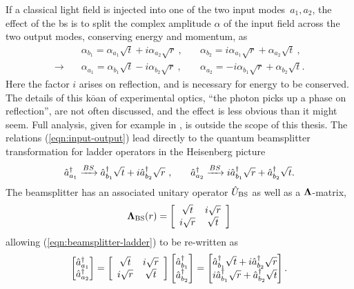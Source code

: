 If a classical light field is injected into one of the two input modes~$a_1, a_2$,  the effect of the \gls{bs} is to split the 
complex amplitude $\alpha$ of the input field across the two output modes, conserving energy and momentum, as
\begin{align}
    &\alpha_{b_1} = \alpha_{a_1} \sqrt{t} + i \alpha_{a_2} \sqrt{r}~,\quad
    &\alpha_{b_2} = i \alpha_{a_1} \sqrt{r} + \alpha_{a_2} \sqrt{t}~,\\
    \rightarrow \quad   &\alpha_{a_1} = \alpha_{b_1} \sqrt{t} - i \alpha_{b_2} \sqrt{r}~,\quad
    &\alpha_{a_2} = - i \alpha_{b_1} \sqrt{r} + \alpha_{b_2} \sqrt{t}.
    \label{eqn:input-output}
\end{align}
Here the factor $i$ arises on reflection, and is necessary for energy to be conserved. 
The details of this k$\mathrm{\bar{o}}$an of experimental optics, ``the photon picks up a phase on reflection'', are not often discussed, and the effect is less obvious than it might seem. Full analysis, given for example in \cite{Zetie2000}, is outside the scope of this thesis.
The relations (\ref{eqn:input-output}) lead directly to the quantum beamsplitter transformation for ladder operators in the Heisenberg picture
\begin{align}
    &\hat{a}^{\dagger}_{a_1}  \xrightarrow{BS} \hat{a}^{\dagger}_{b_1} \sqrt{t} + i \hat{a}^{\dagger}_{b_2} \sqrt{r} ~,\quad
    &\hat{a}^{\dagger}_{a_2}  \xrightarrow{BS} i \hat{a}^{\dagger}_{b_1} \sqrt{r} + \hat{a}^{\dagger}_{b_2} \sqrt{t}.
    \label{eqn:beamsplitter-ladder}
\end{align}
The beamsplitter has an associated unitary operator $\hat{U}_\mathrm{BS}$ as well as a $\mathbf{\Lambda}$-matrix, 
\begin{gather}
    \mathbf{\Lambda}_\mathrm{BS}(r)=
    \left[
    \begin{array}{cc}
        \sqrt{t} & i\sqrt{r} \\
        i\sqrt{r} & \sqrt{t} 
    \end{array}
\right]
\label{eqn:beamsplitter-unitary}
\end{gather}
allowing (\ref{eqn:beamsplitter-ladder}) to be re-written as 
\begin{gather}
\begin{bmatrix} \hat{a}^{\dagger}_{a_1}\\ \hat{a}^{\dagger}_{a_2} \end{bmatrix} 
=
\left[
\begin{array}{cc} \sqrt{t} & i\sqrt{r}\\ i\sqrt{r} & \sqrt{t} \end{array} 
\right]
\begin{bmatrix} \hat{a}^{\dagger}_{b_1}\\ \hat{a}^{\dagger}_{b_2} \end{bmatrix} 
=
\begin{bmatrix} 
    \hat{a}^{\dagger}_{b_1}\sqrt{t}  + i\hat{a}^{\dagger}_{b_2}\sqrt{r} \\ i\hat{a}^{\dagger}_{b_1}\sqrt{r} + \hat{a}^{\dagger}_{b_2}\sqrt{t} 
\end{bmatrix}.
\end{gather}

